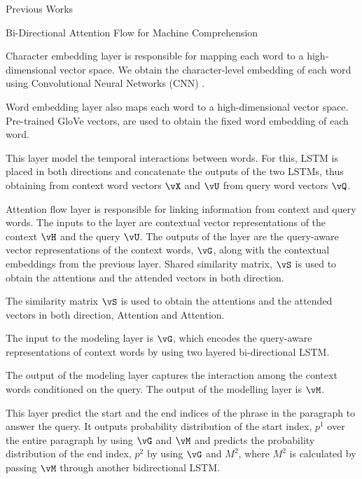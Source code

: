 \documentclass{article}
\begin{document}
\begin{psection}{Previous Works}
\begin{psubsection}{Bi-Directional Attention Flow for Machine Comprehension}
		\begin{enumerate}[label=\bt{\theenumi.}]
			 Character embedding layer is responsible for mapping each word to a high-dimensional vector space.
			We obtain the character-level embedding of each word using Convolutional Neural Networks (CNN) \citep{Char_embedding}.

			 Word embedding layer also maps each word to a high-dimensional vector space.
			Pre-trained GloVe vectors, are used to obtain the fixed word embedding of each word.

			 This layer model the temporal interactions between words.
			For this, LSTM is placed in both directions and concatenate the outputs of the two LSTMs, thus obtaining  from context word vectors $\vX$ and $\vU$ from query word vectors $\vQ$.

			 Attention flow layer is responsible for linking information from context and query words.
			The inputs to the layer are contextual vector representations of the context $\vH$ and the query $\vU$.
			The outputs of the layer are the query-aware vector representations of the context words, $\vG$, along with the contextual embeddings from the previous layer. Shared similarity matrix, $\vS$ is used to obtain the attentions and the attended vectors in both direction.

			The similarity matrix $\vS$ is used to obtain the attentions and the attended vectors in both direction, \ie {} Attention and  Attention.

			 The input to the modeling layer is $\vG$, which encodes the query-aware representations of context words by using two layered bi-directional LSTM.

			The output of the modeling layer captures the interaction among the context words conditioned on the query.
			The output of the modelling layer is $\vM$.

			 This layer predict the start and the end indices of the phrase in the paragraph to answer the query.
			It outputs probability distribution of the start index, $p^1$ over the entire paragraph by using $\vG$ and $\vM$ and predicts the probability distribution of the end index, $p^2$ by using $\vG$ and $M^{2}$, where $M^{2}$ is calculated by passing $\vM$ through another bidirectional LSTM.

		\end{enumerate}


\end{psubsection}
\end{psection}
\end{document}
